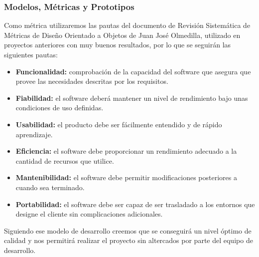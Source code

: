 \subsubsection{Modelos, Métricas y Prototipos}
\par Como métrica utilizaremos las pautas del documento de Revisión Sistemática de Métricas de Diseño Orientado a Objetos de Juan José Olmedilla, utilizado en proyectos anteriores con muy buenos resultados, por lo que se seguirán las siguientes pautas:
\begin{itemize}
	\item \textbf{Funcionalidad:} comprobación de la capacidad del software que asegura que provee las necesidades descritas por los requisitos.
	\item \textbf{Fiabilidad:} el software deberá mantener un nivel de rendimiento bajo unas condiciones de uso definidas.
	\item \textbf{Usabilidad:} el producto debe ser fácilmente entendido y de rápido aprendizaje.
	\item \textbf{Eficiencia:} el software debe proporcionar un rendimiento adecuado a la cantidad de recursos que utilice.
	\item \textbf{Mantenibilidad:} el software debe permitir modificaciones posteriores a cuando sea terminado.
	\item \textbf{Portabilidad:} el software debe ser capaz de ser trasladado a los entornos que designe el cliente sin complicaciones adicionales.
\end{itemize}

\par Siguiendo ese modelo de desarrollo creemos que se conseguirá un nivel óptimo de calidad y nos permitirá realizar el proyecto sin altercados por parte del equipo de desarrollo.